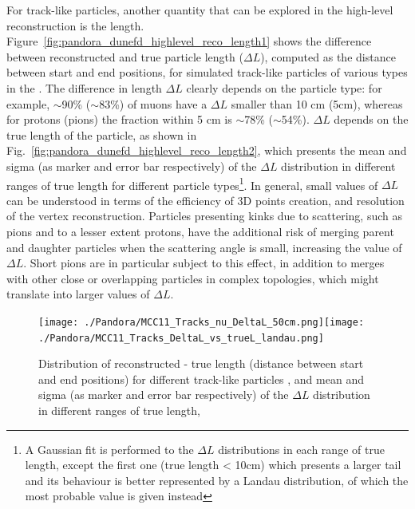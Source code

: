 For track-like particles, another quantity that can be explored in the high-level reconstruction is the length. Figure~\ref{fig:pandora_dunefd_highlevel_reco_length1} shows the difference between reconstructed and true particle length ($\Delta L$), computed as the \threed distance between start and end positions, for simulated track-like particles of various types in the . The difference in length $\Delta L$ clearly depends on the particle type: for example, $\sim$90\% ($\sim$83\%) of muons have a $\Delta L$ smaller than 10 cm (5cm), whereas for protons (pions) the fraction within 5 cm is $\sim$78\% ($\sim$54\%). $\Delta L$ depends on the true length of the particle, as shown in Fig.~\ref{fig:pandora_dunefd_highlevel_reco_length2}, which presents the mean and sigma (as marker and error bar respectively) of the $\Delta L$ distribution in different ranges of true length for different particle types\footnote{A Gaussian fit is performed to the $\Delta L$ distributions in each range of true length, except the first one (true length < 10cm) which presents a larger tail and its behaviour is better represented by a Landau distribution, of which the most probable value is given instead}. In general, small values of $\Delta L$ can be understood in terms of the efficiency of 3D points creation, and resolution of the vertex reconstruction. Particles presenting kinks due to scattering, such as pions and to a lesser extent protons, have the additional risk of merging parent and daughter particles when the scattering angle is small, increasing the value of $\Delta L$. Short pions are in particular subject to this effect, in addition to merges with other close or overlapping particles in complex topologies, which might translate into larger values of $\Delta L$. 

\begin{figure}[!ht]   %
\centering
\subfloat[]{\label{fig:pandora_dunefd_highlevel_reco_length1}}\texttt{[image: ./Pandora/MCC11\_Tracks\_nu\_DeltaL\_50cm.png]}\subfloat[]{\label{fig:pandora_dunefd_highlevel_reco_length2}}\texttt{[image: ./Pandora/MCC11\_Tracks\_DeltaL\_vs\_trueL\_landau.png]}
\caption[Distribution of reconstructed-true length for different track-like particles]{Distribution of reconstructed - true length (\threed distance between start and end positions) for different track-like particles \protect{}, and mean and sigma (as marker and error bar respectively) of the $\Delta L$ distribution in different ranges of true length\protect{},}
\label{fig:pandora_dunefd_highlevel_reco_length}
\end{figure}

